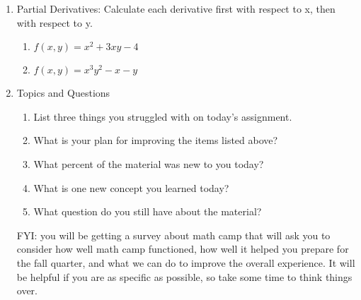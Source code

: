 \documentclass[12pt,thmsa]{article}
\begin{document}
\begin{enumerate}
\item Partial Derivatives: Calculate each derivative first with respect to x, then with respect to y. 
\begin{enumerate}
\item $f(x,y)=x^2+3xy-4$
\item $f(x,y)=x^3y^2-x-y$
\end{enumerate}

\item Topics and Questions
    \begin{enumerate}
        \item List three things you struggled with on today's assignment. 
        \item What is your plan for improving the items listed above?
        \item What percent of the material was new to you today?
        \item What is one new concept you learned today?
        \item What question do you still have about the material?
    \end{enumerate}


\vspace{6mm}
 FYI: you will be getting a survey about math camp that will ask you to consider how well math camp functioned, how well it helped you prepare for the fall quarter, and what we can do to improve the overall experience. It will be helpful if you are as specific as possible, so take some time to think things over. 

\end{enumerate}
\end{document}
